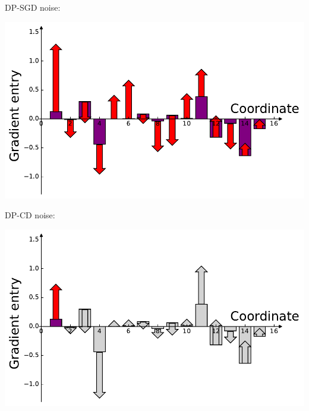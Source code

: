 \documentclass[17pt,aspectratio=169]{beamer}
\begin{document}
\begin{frame}
  \begin{minipage}{0.5\linewidth}
    DP-SGD noise:
    \vspace{.2em}
    \begin{center}
      \includegraphics[width=0.9\linewidth]{img/normal_grad.pdf}%
    \end{center}
  \end{minipage}%
  \begin{minipage}{0.5\linewidth}
    DP-CD noise:
    \begin{center}
        \includegraphics[width=0.9\linewidth]{img/normal_grad_0.pdf}
      \end{center}
  \end{minipage}
\end{frame}
\end{document}
